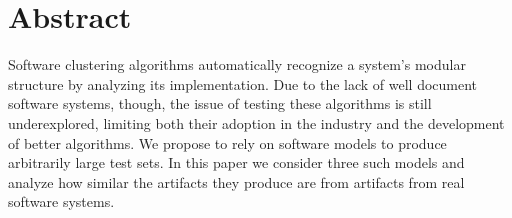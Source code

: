 \newcommand{\din}[0]{\ensuremath{\delta_{in}}}
\newcommand{\dout}[0]{\ensuremath{\delta_{out}}}


%

%
%


%
%
%
%
%
%
%
%

\section{Abstract} 

Software clustering algorithms automatically recognize a system's modular
structure by analyzing its implementation.  Due to the lack of well document
software systems, though, the issue of testing these algorithms is still
underexplored, limiting both their adoption in the industry and the development
of better algorithms.  We propose to rely on software models to produce
arbitrarily large test sets. In this paper we consider three such models and
analyze how similar the artifacts they produce are from artifacts from real
software systems.

